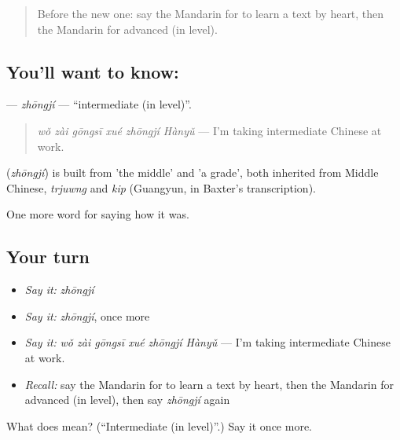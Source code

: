 \label{lesson:ZH-C496-zhongji}



\begin{quote}
Before the new one: say the Mandarin for to learn a text by heart, then the Mandarin for advanced (in level).
\end{quote}

\subsection*{You'll want to know: }
\textbf{} — \emph{zhōngjí} — \textquotedblleft{}intermediate (in level)\textquotedblright{}.

\begin{quote}
\textbf{} \emph{wǒ zài gōngsī xué zhōngjí Hànyǔ} — I'm taking intermediate Chinese at work.
\end{quote}

\begin{cousinweb}
\textbf{} (\emph{zhōngjí}) is built from  'the middle' and  'a grade', both inherited from Middle Chinese, \emph{trjuwng} and \emph{kip} (Guangyun, in Baxter's transcription).
\end{cousinweb}

\begin{grammarlens}[title={What you've built}]
One more word for saying how it was.
\end{grammarlens}

\subsection*{Your turn}
\begin{itemize}
\raggedright
  \item \emph{Say it:} \emph{zhōngjí}
  \item \emph{Say it:} \emph{zhōngjí}, once more
  \item \emph{Say it:} \emph{wǒ zài gōngsī xué zhōngjí Hànyǔ} — I'm taking intermediate Chinese at work.
  \item \emph{Recall:} say the Mandarin for to learn a text by heart, then the Mandarin for advanced (in level), then say \emph{zhōngjí} again
\end{itemize}

\begin{tcolorbox}[breakable,colback=teal!4,colframe=teal!35!black,title={Before you move on}]
What does  mean? (\textquotedblleft{}Intermediate (in level)\textquotedblright{}.) Say it once more.
\end{tcolorbox}
